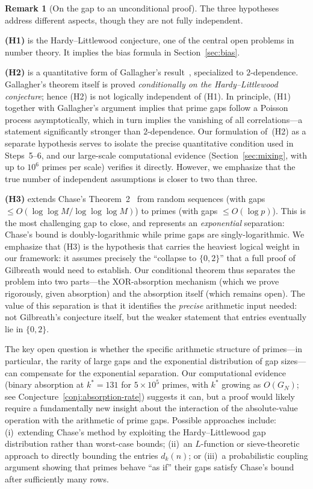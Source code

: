 \documentclass[11pt, a4paper]{amsart}
\theoremstyle{plain}
\theoremstyle{definition}
\newtheorem{remark}[theorem]{Remark}
\begin{document}
\begin{remark}[On the gap to an unconditional proof]\label{rem:gap}
The three hypotheses address different aspects, though they are not fully independent.

\textbf{(H1)} is the Hardy--Littlewood conjecture, one of the central open problems in number theory. It implies
the bias formula in Section~\ref{sec:bias}.

\textbf{(H2)} is a quantitative form of Gallagher's result~\cite{Gallagher1976}, specialized to $2$-dependence.
Gallagher's theorem itself is proved \emph{conditionally on the Hardy--Littlewood conjecture}; hence (H2) is not
logically independent of (H1). In principle, (H1) together with Gallagher's argument implies that prime gaps follow
a Poisson process asymptotically, which in turn implies the vanishing of all correlations---a statement
significantly stronger than $2$-dependence. Our formulation of~(H2) as a separate hypothesis serves to isolate
the precise quantitative condition used in Steps~5--6, and our large-scale computational evidence
(Section~\ref{sec:mixing}, with up to $10^6$ primes per scale) verifies it directly. However, we emphasize that
the true number of independent assumptions is closer to two than three.

\textbf{(H3)} extends Chase's Theorem~2~\cite{Chase2020} from random sequences (with gaps $\le O(\log\log M / \log\log\log M)$)
to primes (with gaps $\le O(\log p)$). This is the most challenging gap to close, and represents an
\emph{exponential} separation: Chase's bound is doubly-logarithmic while prime gaps are singly-logarithmic.
We emphasize that (H3) is the hypothesis that carries the heaviest logical weight in our framework:
it assumes precisely the ``collapse to $\{0,2\}$'' that a full proof of Gilbreath would need to establish.
Our conditional theorem thus separates the problem into two parts---the XOR-absorption mechanism
(which we prove rigorously, given absorption) and the absorption itself (which remains open).
The value of this separation is that it identifies the \emph{precise} arithmetic input needed:
not Gilbreath's conjecture itself, but the weaker statement that entries eventually lie in $\{0, 2\}$.

The key open question is whether the specific arithmetic structure of primes---in particular, the rarity of
large gaps and the exponential distribution of gap sizes---can compensate for the exponential separation.
Our computational evidence (binary absorption at $k^* = 131$ for $5 \times 10^5$ primes, with $k^*$ growing
as $O(G_N)$; see Conjecture~\ref{conj:absorption-rate}) suggests it can,
but a proof would likely require a fundamentally new insight about the interaction of the absolute-value
operation with the arithmetic of prime gaps. Possible approaches include: (i)~extending Chase's method by
exploiting the Hardy--Littlewood gap distribution rather than worst-case bounds; (ii)~an $L$-function or
sieve-theoretic approach to directly bounding the entries $d_k(n)$; or (iii)~a probabilistic coupling argument
showing that primes behave ``as if'' their gaps satisfy Chase's bound after sufficiently many rows.
\end{remark}
\end{document}
